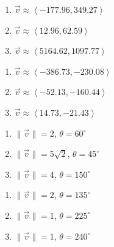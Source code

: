 \documentclass{ximera}
\begin{document}
 

 

\begin{enumerate}

\setcounter{enumi}{\value{HW}}

\item $\overrightarrow{v} \approx \left<-177.96, 349.27\right>$
\item $\overrightarrow{v} \approx \left<12.96, 62.59\right>$
\item $\overrightarrow{v} \approx \left<5164.62, 1097.77\right>$

\setcounter{HW}{\value{enumi}}

\end{enumerate}

 

 

\begin{enumerate}

\setcounter{enumi}{\value{HW}}

\item $\overrightarrow{v} \approx \left<-386.73, -230.08\right>$
\item $\overrightarrow{v} \approx \left<-52.13, -160.44\right>$
\item $\overrightarrow{v} \approx \left<14.73, -21.43\right>$

\setcounter{HW}{\value{enumi}}

\end{enumerate}

 

 

\begin{enumerate}

\setcounter{enumi}{\value{HW}}

\item  $\|\overrightarrow{v}\| = 2$, $\theta = 60^{\circ}$
\item $\|\overrightarrow{v}\| = 5\sqrt{2}$, $\theta = 45^{\circ}$
\item $\|\overrightarrow{v}\| = 4$, $\theta = 150^{\circ}$

\setcounter{HW}{\value{enumi}}

\end{enumerate}

 

 

\begin{enumerate}

\setcounter{enumi}{\value{HW}}

\item $\|\overrightarrow{v}\| = 2$, $\theta = 135^{\circ}$
\item $\|\overrightarrow{v}\| = 1$, $\theta = 225^{\circ}$
\item $\|\overrightarrow{v}\| = 1$, $\theta = 240^{\circ}$

\setcounter{HW}{\value{enumi}}

\end{enumerate}
\end{document}
